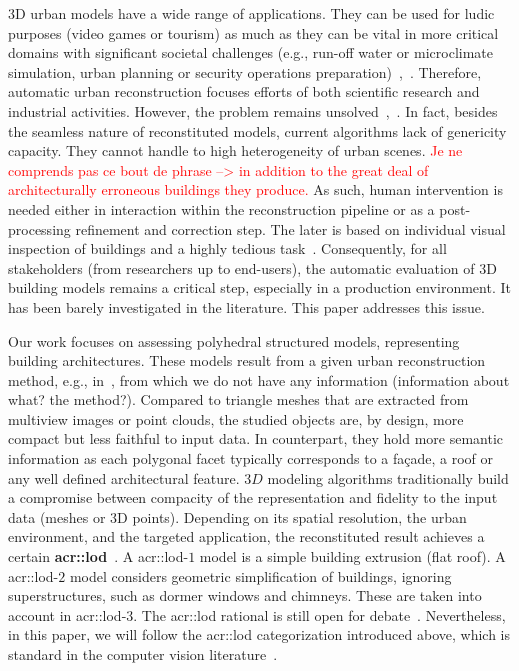 \documentclass[runningheads]{llncs}
\begin{document}
    3D urban models have a wide range of applications. They can be used for ludic purposes (video games or tourism) as much as they can be vital in more critical domains with significant societal challenges (e.g., run-off water or microclimate simulation, urban planning or security operations preparation)~\cite{Biljecki2015},~\cite{Musialski2012}. Therefore, automatic urban reconstruction focuses efforts of both scientific research and industrial activities. However, the problem remains unsolved~\cite{Musialski2012},~\cite{rottensteiner2014results}. In fact, besides the seamless nature of reconstituted models, current algorithms lack of genericity capacity. They cannot handle to high heterogeneity of urban scenes. \textcolor{red}{Je ne comprends pas ce bout de phrase  --> in addition to the great deal of architecturally erroneous buildings they produce.} As such, human intervention is needed either in interaction within the reconstruction pipeline or as a post-processing refinement and correction step. The later is based on individual visual inspection of buildings and a highly tedious task~\cite{Musialski2012}. Consequently, for all stakeholders (from researchers up to end-users), the automatic evaluation of 3D building models remains a critical step, especially in a production environment. It has been barely investigated in the literature. This paper addresses this issue.

    Our work focuses on assessing polyhedral structured models, representing building architectures. These models result from a given urban reconstruction method, e.g., in~\cite{dick2004modelling}, from which we do not have any information{\color{green} (information about what? the method?)}. Compared to triangle meshes that are extracted from multiview images or point clouds, the studied objects are, by design, more compact but less faithful to input data. In counterpart, they hold more semantic information as each polygonal facet typically corresponds to a fa\c{c}ade, a roof or any well defined architectural feature. $3D$ modeling algorithms traditionally build a compromise between compacity of the representation and fidelity to the input data (meshes or 3D points). Depending on its spatial resolution, the urban environment, and the targeted application, the reconstituted result achieves a certain \textbf{\gls{acr::lod}}~\cite{kolbe2005citygml}. A \acrshort{acr::lod}-$1$ model is a simple building extrusion (flat roof). A \acrshort{acr::lod}-$2$ model considers geometric simplification of buildings, ignoring superstructures, such as dormer windows and chimneys. These are taken into account in \acrshort{acr::lod}-$3$. The \acrshort{acr::lod} rational is still open for debate~\cite{2016_ceus_improved_lod}. Nevertheless, in this paper, we will follow the \acrshort{acr::lod} categorization introduced above, which is standard in the computer vision literature~\cite{verdie2015lod}.
\end{document}
